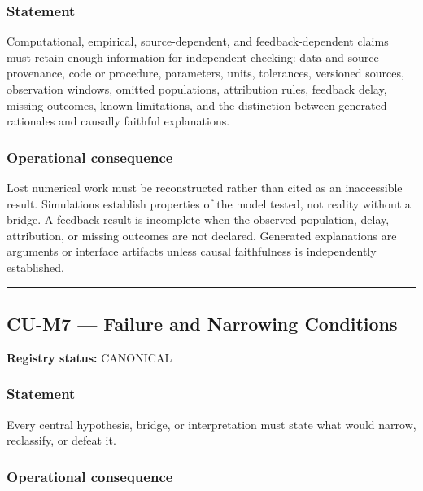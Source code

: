 \documentclass[
  11pt,
]{article}
\begin{document}
\subsubsection{Statement}\label{statement-14}

Computational, empirical, source-dependent, and feedback-dependent
claims must retain enough information for independent checking: data and
source provenance, code or procedure, parameters, units, tolerances,
versioned sources, observation windows, omitted populations, attribution
rules, feedback delay, missing outcomes, known limitations, and the
distinction between generated rationales and causally faithful
explanations.

\subsubsection{Operational
consequence}\label{operational-consequence-14}

Lost numerical work must be reconstructed rather than cited as an
inaccessible result. Simulations establish properties of the model
tested, not reality without a bridge. A feedback result is incomplete
when the observed population, delay, attribution, or missing outcomes
are not declared. Generated explanations are arguments or interface
artifacts unless causal faithfulness is independently established.

\begin{center}\rule{0.5\linewidth}{0.5pt}\end{center}

\subsection{CU-M7 --- Failure and Narrowing
Conditions}\label{cu-m7-failure-and-narrowing-conditions}

\textbf{Registry status:} CANONICAL

\subsubsection{Statement}\label{statement-15}

Every central hypothesis, bridge, or interpretation must state what
would narrow, reclassify, or defeat it.

\subsubsection{Operational
consequence}\label{operational-consequence-15}
\end{document}
